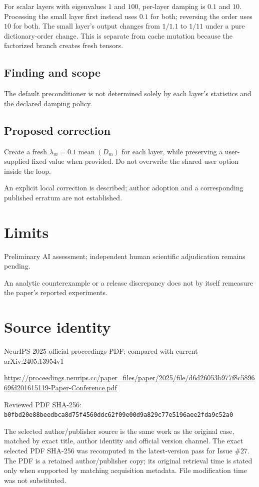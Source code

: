 \documentclass[11pt]{article}
\begin{document}
For scalar layers with eigenvalues \(1\) and \(100\), per-layer damping is \(0.1\) and \(10\). Processing the small layer first instead uses \(0.1\) for both; reversing the order uses \(10\) for both. The small layer’s output changes from \(1/1.1\) to \(1/11\) under a pure dictionary-order change. This is separate from cache mutation because the factorized branch creates fresh tensors.

\subsection*{Finding and scope}

The default preconditioner is not determined solely by each layer’s statistics and the declared damping policy.

\subsection*{Proposed correction}

Create a fresh \(\lambda_m=0.1\operatorname{mean}(D_m)\) for each layer, while preserving a user-supplied fixed value when provided. Do not overwrite the shared user option inside the loop.

An explicit local correction is described; author adoption and a corresponding published erratum are not established.

\section*{Limits}

Preliminary AI assessment; independent human scientific adjudication remains pending.\par

An analytic counterexample or a release discrepancy does not by itself remeasure the paper’s reported experiments.\par

\section*{Source identity}

NeurIPS 2025 official proceedings PDF; compared with current arXiv:2405.13954v1

\url{https://proceedings.neurips.cc/paper_files/paper/2025/file/d6d26053b977f8c589669fd201615119-Paper-Conference.pdf}

Reviewed PDF SHA-256: \nolinkurl{b0fbd20e88beedbca8d75f4560ddc62f09e00d9a829c77e5196aee2fda9c52a0}

The selected author/publisher source is the same work as the original case, matched by exact title, author identity and official version channel. The exact selected PDF SHA-256 was recomputed in the latest-version pass for Issue \#27. The PDF is a retained author/publisher copy; its original retrieval time is stated only when supported by matching acquisition metadata. File modification time was not substituted.
\end{document}
